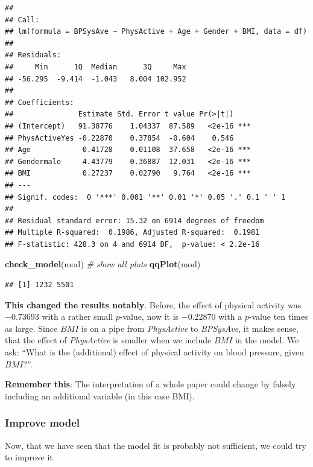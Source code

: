 \documentclass[
]{book}
\newenvironment{Shaded}{\begin{snugshade}}{\end{snugshade}}
\newcommand{\CommentTok}[1]{\textcolor[rgb]{0.56,0.35,0.01}{\textit{#1}}}
\newcommand{\FunctionTok}[1]{\textcolor[rgb]{0.13,0.29,0.53}{\textbf{#1}}}
\newcommand{\NormalTok}[1]{#1}
\begin{document}
\begin{verbatim}
## 
## Call:
## lm(formula = BPSysAve ~ PhysActive + Age + Gender + BMI, data = df)
## 
## Residuals:
##     Min      1Q  Median      3Q     Max 
## -56.295  -9.414  -1.043   8.004 102.952 
## 
## Coefficients:
##               Estimate Std. Error t value Pr(>|t|)    
## (Intercept)   91.38776    1.04337  87.589   <2e-16 ***
## PhysActiveYes -0.22870    0.37854  -0.604    0.546    
## Age            0.41728    0.01108  37.658   <2e-16 ***
## Gendermale     4.43779    0.36887  12.031   <2e-16 ***
## BMI            0.27237    0.02790   9.764   <2e-16 ***
## ---
## Signif. codes:  0 '***' 0.001 '**' 0.01 '*' 0.05 '.' 0.1 ' ' 1
## 
## Residual standard error: 15.32 on 6914 degrees of freedom
## Multiple R-squared:  0.1986, Adjusted R-squared:  0.1981 
## F-statistic: 428.3 on 4 and 6914 DF,  p-value: < 2.2e-16
\end{verbatim}

\begin{Shaded}
\begin{Highlighting}[]
\FunctionTok{check\_model}\NormalTok{(mod) }\CommentTok{\# show all plots}
\FunctionTok{qqPlot}\NormalTok{(mod) }
\end{Highlighting}
\end{Shaded}

\begin{verbatim}
## [1] 1232 5501
\end{verbatim}

\textbf{This changed the results notably}. Before, the effect of physical activity was \(-0.73693\)
with a rather small \(p\)-value,
now it is \(-0.22870\) with a \(p\)-value ten times as large.
Since \(BMI\) is on a pipe from \emph{PhysActive} to \emph{BPSysAve}, it makes sense,
that the effect of \emph{PhysActive} is smaller when we include \(BMI\) in the model.
We ask: ``What is the (additional) effect of physical activity on blood pressure,
given \(BMI\)?''.

\textbf{Remember this}: The interpretation of a whole paper could change by falsely including
an additional variable (in this case BMI).

\subsubsection{Improve model}\label{improve_model_NHANES}

Now, that we have seen that the model fit is probably not sufficient, we could try to improve it.
\end{document}
